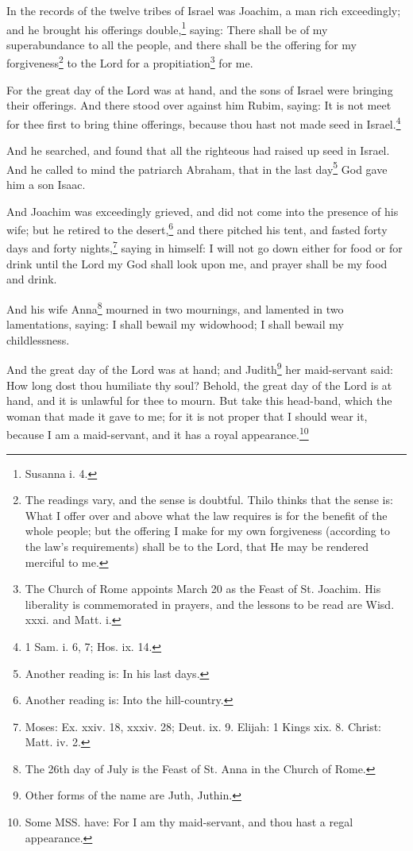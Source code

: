 \pstart
{}

\pend\setcounter{pstartR}{1}\pstart
In the records of the twelve tribes of Israel was Joachim, a man rich exceedingly; and he brought his offerings double,\footnote{Susanna i. 4.} saying: There shall be of my superabundance to all the people, and there shall be the offering for my forgiveness\footnote{The readings vary, and the sense is doubtful. Thilo thinks that the sense is: What I offer over and above what the law requires is for the benefit of the whole people; but the offering I make for my own forgiveness (according to the law's requirements) shall be to the Lord, that He may be rendered merciful to me.} to the Lord for a propitiation\footnote{The Church of Rome appoints March 20 as the Feast of St. Joachim. His liberality is commemorated in prayers, and the lessons to be read are Wisd. xxxi. and Matt. i.} for me.

\pend\pstart
For the great day of the Lord was at hand, and the sons of Israel were bringing their offerings. And there stood over against him Rubim, saying: It is not meet for thee first to bring thine offerings, because thou hast not made seed in Israel.\footnote{1 Sam. i. 6, 7; Hos. ix. 14.}

\pend\pstart
And he searched, and found that all the righteous had raised up seed in Israel. And he called to mind the patriarch Abraham, that in the last day\footnote{Another reading is: In his last days.} God gave him a son Isaac.

\pend\pstart
And Joachim was exceedingly grieved, and did not come into the presence of his wife; but he retired to the desert,\footnote{Another reading is: Into the hill-country.} and there pitched his tent, and fasted forty days and forty nights,\footnote{Moses: Ex. xxiv. 18, xxxiv. 28; Deut. ix. 9. Elijah: 1 Kings xix. 8. Christ: Matt. iv. 2.} saying in himself: I will not go down either for food or for drink until the Lord my God shall look upon me, and prayer shall be my food and drink.

\pend\pstart
{}

\pend\setcounter{pstartR}{1}\pstart
And his wife Anna\footnote{The 26th day of July is the Feast of St. Anna in the Church of Rome.} mourned in two mournings, and lamented in two lamentations, saying: I shall bewail my widowhood; I shall bewail my childlessness.

\pend\pstart
And the great day of the Lord was at hand; and Judith\footnote{Other forms of the name are Juth, Juthin.} her maid-servant said: How long dost thou humiliate thy soul? Behold, the great day of the Lord is at hand, and it is unlawful for thee to mourn. But take this head-band, which the woman that made it gave to me; for it is not proper that I should wear it, because I am a maid-servant, and it has a royal appearance.\footnote{Some MSS. have: For I am thy maid-servant, and thou hast a regal appearance.}

